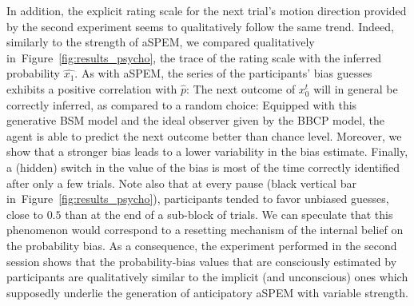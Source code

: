 \documentclass[12pt,english]{article}%
\newcommand{\seeFig}[1]{Figure~\ref{fig:#1}}
\begin{document}
\label{sec:rating_scale}
In addition, the explicit rating scale
for the next trial's motion direction
provided by the second experiment
seems to qualitatively follow the same trend.
Indeed, similarly to the strength of aSPEM, we compared
qualitatively in~\seeFig{results_psycho},
the trace of the rating scale 
with the inferred probability $\hat{x_1}$.
As with aSPEM, the series of the participants' bias guesses 
exhibits a positive correlation with $\hat{p}$:
The next outcome of $x_{0}^{t}$ will in general be correctly inferred,
as compared to a random choice: 
Equipped with this generative BSM model and the ideal observer given by the BBCP model,
the agent is able to predict the next outcome better than chance level. 
Moreover, we show that a stronger bias leads to a lower variability in the bias estimate.
Finally, a (hidden) switch in the value of the bias is
most of the time correctly identified after only a few trials.
Note also that at every pause (black vertical bar in~\seeFig{results_psycho}),
participants tended to favor unbiased guesses, close to $0.5$
than at the end of a sub-block of trials.
We can speculate that this phenomenon would correspond 
to a resetting mechanism of the internal belief on the probability bias.
As a consequence, the experiment performed in the second session
shows that the probability-bias values that are consciously estimated by participants
are qualitatively similar to the implicit (and unconscious) ones 
which supposedly underlie the generation of anticipatory aSPEM with variable strength.
\end{document}
